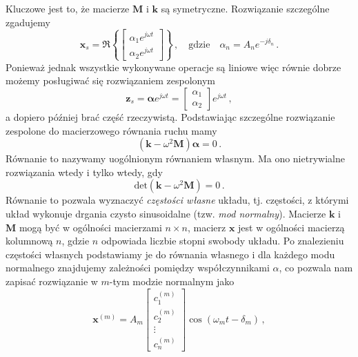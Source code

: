 \documentclass[../main.tex]{subfiles}
\begin{document}
    Kluczowe jest to, że macierze \(\mathbf{M}\) i \(\mathbf{k}\) są symetryczne. Rozwiązanie
    szczególne zgadujemy
    \begin{equation*}
        \mathbf{x}_s=\Re\left\{\begin{bmatrix}\alpha_1e^{j\omega t}\\\alpha_2e^{j\omega t}\end{bmatrix}\right\}\,,\quad\text{gdzie}\quad\alpha_n=A_ne^{-j\delta_n}\,.
        \end{equation*}
        Ponieważ jednak wszystkie wykonywane operacje są liniowe więc równie dobrze możemy
        posługiwać się rozwiązaniem zespolonym
        \begin{equation*}
            \mathbf{z}_s=\boldsymbol{\alpha}e^{j\omega t}=\begin{bmatrix}\alpha_1\\\alpha_2\end{bmatrix}e^{j\omega t}\,,
        \end{equation*}
        a dopiero później brać część rzeczywistą. Podstawiając szczególne rozwiązanie zespolone do
        macierzowego równania ruchu mamy
        \begin{equation*}
            (\mathbf{k}-\omega^2\mathbf{M})\boldsymbol{\alpha}=0\,.
        \end{equation*}
        Równanie to nazywamy uogólnionym równaniem własnym. Ma ono nietrywialne rozwiązania wtedy i
        tylko wtedy, gdy 
        \begin{equation*}
            \text{det}(\mathbf{k}-\omega^2\mathbf{M})=0\,.
        \end{equation*}
        Równanie to pozwala wyznaczyć \textit{częstości własne} układu, tj. częstości, z którymi
        układ wykonuje drgania czysto sinusoidalne (tzw. \textit{mod normalny}). Macierze
        \(\mathbf{k}\) i \(\mathbf{M}\) mogą być w ogólności macierzami \(n\times n\), macierz
        \(\mathbf{x}\) jest w ogólności macierzą kolumnową \(n\), gdzie \(n\) odpowiada liczbie
        stopni swobody układu. Po znalezieniu częstości własnych podstawiamy je do równania własnego
        i dla każdego modu normalnego znajdujemy zależności pomiędzy współczynnikami \(\alpha\), co
        pozwala nam zapisać rozwiązanie w \(m\)-tym modzie normalnym jako
        \begin{equation*}
            \mathbf{x}^{(m)}=A_m\begin{bmatrix} c_1^{(m)}\\c_2^{(m)}\\\vdots\\c_n^{(m)}\end{bmatrix}\cos(\omega_mt-\delta_m)\,,
        \end{equation*}
\end{document}
